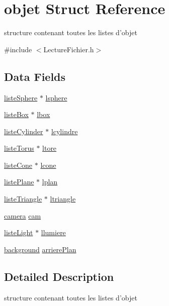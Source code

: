 \hypertarget{structobjet}{
\section{objet Struct Reference}
\label{structobjet}
}


structure contenant toutes les listes d'objet  




{\ttfamily \#include $<$LectureFichier.h$>$}

\subsection*{Data Fields}
\begin{DoxyCompactItemize}
\item 
\hyperlink{structliste_sphere}{listeSphere} $\ast$ \hyperlink{structobjet_ad6fc54edaae24f34f8093b277a3b2d04}{lsphere}
\item 
\hyperlink{structliste_box}{listeBox} $\ast$ \hyperlink{structobjet_a5b7114d3e4c7527479db2477acc69180}{lbox}
\item 
\hyperlink{structliste_cylinder}{listeCylinder} $\ast$ \hyperlink{structobjet_a28b52bc13fd24dcd25e9e9d6c073ee97}{lcylindre}
\item 
\hyperlink{structliste_torus}{listeTorus} $\ast$ \hyperlink{structobjet_a47505e910fde32e049a2e94ad84b48c0}{ltore}
\item 
\hyperlink{structliste_cone}{listeCone} $\ast$ \hyperlink{structobjet_aa328f20993d25abe873904ada1aadad0}{lcone}
\item 
\hyperlink{structliste_plane}{listePlane} $\ast$ \hyperlink{structobjet_a6c0864a0bbb65be0c48b341061498fd9}{lplan}
\item 
\hyperlink{structliste_triangle}{listeTriangle} $\ast$ \hyperlink{structobjet_aa64fa005027990999edeea5037673d45}{ltriangle}
\item 
\hyperlink{structcamera}{camera} \hyperlink{structobjet_a16ecffc15a7a4163203346c420ba58f6}{cam}
\item 
\hyperlink{structliste_light}{listeLight} $\ast$ \hyperlink{structobjet_a6c4654d9a5ac31412ffe066d9113018d}{llumiere}
\item 
\hyperlink{structbackground}{background} \hyperlink{structobjet_a2c4fed069a158bd329fc92ff1a608896}{arrierePlan}
\end{DoxyCompactItemize}


\subsection{Detailed Description}
structure contenant toutes les listes d'objet 

